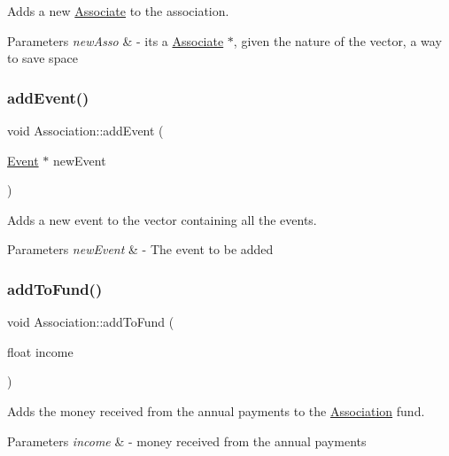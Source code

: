 Adds a new \hyperlink{classAssociate}{Associate} to the association. 


\begin{DoxyParams}{Parameters}
{\em new\+Asso} & -\/ it\textquotesingle{}s a \hyperlink{classAssociate}{Associate} $\ast$, given the nature of the vector, a way to save space \\
\hline
\end{DoxyParams}
\mbox{\label{classAssociation_a047b29b0d39da0695de0200ad495dee1}} 
\subsubsection{\texorpdfstring{add\+Event()}{addEvent()}}
{\footnotesize\ttfamily void Association\+::add\+Event (\begin{DoxyParamCaption}\item[{\hyperlink{classEvent}{Event} $\ast$}]{new\+Event }\end{DoxyParamCaption})}



Adds a new event to the vector containing all the events. 


\begin{DoxyParams}{Parameters}
{\em new\+Event} & -\/ The event to be added \\
\hline
\end{DoxyParams}
\mbox{\label{classAssociation_a48cf9a1d1e3d2e0e588cbbe7d2d5cd3b}} 
\subsubsection{\texorpdfstring{add\+To\+Fund()}{addToFund()}}
{\footnotesize\ttfamily void Association\+::add\+To\+Fund (\begin{DoxyParamCaption}\item[{float}]{income }\end{DoxyParamCaption})}



Adds the money received from the annual payments to the \hyperlink{classAssociation}{Association} fund. 


\begin{DoxyParams}{Parameters}
{\em income} & -\/ money received from the annual payments \\
\hline
\end{DoxyParams}
\mbox{\label{classAssociation_aa3bd82b207ae1ac0e44df1b481d4a8a1}} 
